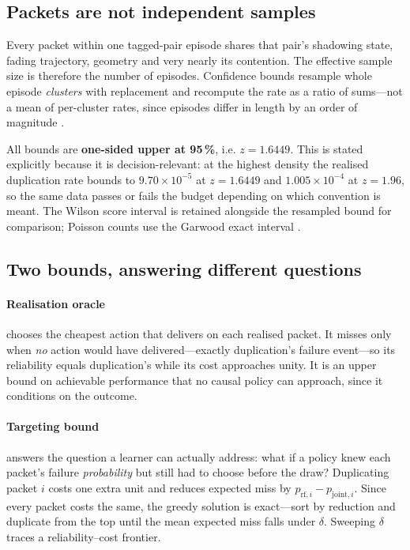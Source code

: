 \documentclass[conference]{IEEEtran}
\begin{document}
\subsection{Packets are not independent samples}

Every packet within one tagged-pair episode shares that pair's shadowing
state, fading trajectory, geometry and very nearly its contention. The
effective sample size is therefore the number of episodes. Confidence bounds
resample whole episode \emph{clusters} with replacement and recompute the rate
as a ratio of sums---not a mean of per-cluster rates, since episodes differ in
length by an order of magnitude \cite{cameron2015}.

All bounds are \textbf{one-sided upper at 95\,\%}, i.e. $z=1.6449$. This is
stated explicitly because it is decision-relevant: at the highest density the
realised duplication rate bounds to $9.70\times10^{-5}$ at $z=1.6449$ and
$1.005\times10^{-4}$ at $z=1.96$, so the same data passes or fails the budget
depending on which convention is meant. The Wilson score interval
\cite{wilson1927} is retained alongside the resampled bound for comparison;
Poisson counts use the Garwood exact interval \cite{garwood1936}.

\subsection{Two bounds, answering different questions}

\paragraph{Realisation oracle} chooses the cheapest action that delivers on
each realised packet. It misses only when \emph{no} action would have
delivered---exactly duplication's failure event---so its reliability equals
duplication's while its cost approaches unity. It is an upper bound on
achievable performance that no causal policy can approach, since it conditions
on the outcome.

\paragraph{Targeting bound} answers the question a learner can actually
address: what if a policy knew each packet's failure \emph{probability} but
still had to choose before the draw? Duplicating packet $i$ costs one extra
unit and reduces expected miss by $p_{\mathrm{rf},i}-p_{\mathrm{joint},i}$.
Since every packet costs the same, the greedy solution is exact---sort by
reduction and duplicate from the top until the mean expected miss falls under
$\delta$. Sweeping $\delta$ traces a reliability--cost frontier.
\end{document}

